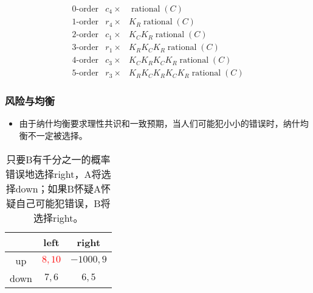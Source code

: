 \documentclass[UTF8,11pt,colorlinks,compress,openany]{beamer}%
\begin{document}
\begin{frame}
\[
\begin{array}{lll}
	\text{0-order} & c_4\times & \operatorname{rational}(C)\\
	\text{1-order} & r_4\times & K_R \operatorname{rational}(C)\\
	\text{2-order} & c_1\times & K_CK_R \operatorname{rational}(C)\\
	\text{3-order} & r_1\times & K_RK_CK_R \operatorname{rational}(C)\\
	\text{4-order} & c_3\times & K_CK_RK_CK_R \operatorname{rational}(C)\\
	\text{5-order} & r_3\times & K_RK_CK_RK_CK_R \operatorname{rational}(C)
\end{array}
\]
\end{frame}

\begin{frame}\frametitle{风险与均衡}
\begin{itemize}
	\item 由于纳什均衡要求理性共识和一致预期，当人们可能犯小小的错误时，纳什均衡不一定被选择。
\end{itemize}
\begin{table}
\begin{tabu}{c|c|c}
\hline
 & left & right \\
\hline
up & \textcolor{red}{$8,10$} & $-1000,9$ \\
down & $7,6$ & $6,5$ \\
\hline
\end{tabu}\caption{只要B有千分之一的概率错误地选择right，A将选择down；如果B怀疑A怀疑自己可能犯错误，B将选择right。}
\end{table}
\end{frame}
\end{document}
